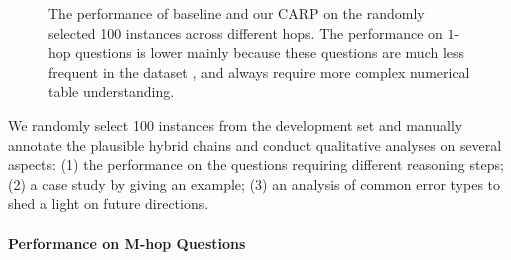 \documentclass[11pt]{article}
\begin{document}
\begin{figure}[t!]
    \centering
    \caption{
The performance of baseline and our CARP on the randomly selected 100 instances across different hops. 
    The performance on $1$-hop questions is lower mainly because these questions are much less frequent in the dataset \cite{chen2020open}, and always require more complex numerical table understanding.}
\label{fig:hop-analysis}
    \vspace{-5mm}
\end{figure} 	\iffalse
	\begin{figure}[t]
		\centering
		\texttt{[image: hop-analysis-light.pdf]}
		\caption{Performance of the baseline and CARP on the questions of different reasoning complexity. The performance on 1-hop questions is lower mainly because these questions are much less frequent in the dataset \cite{chen2020open}, and always require more complex numerical table understanding (like finding the maximum number).}
		\label{fig:hop-analysis}
	\end{figure}
	\fi
	
	We randomly select 100 instances from the development set and manually annotate the plausible hybrid chains and conduct qualitative analyses on several aspects: 
	(1) the performance on the questions requiring different reasoning steps;
	(2) a case study by giving an example;
	(3) an analysis of common error types to shed a light on future directions. 
	\paragraph{Performance on M-hop Questions}
\end{document}
